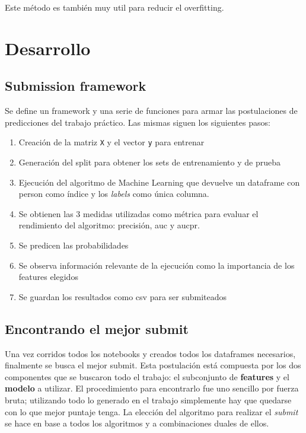 \documentclass[a4paper]{article}
\begin{document}
Este método es también muy util para reducir el overfitting.

\section{Desarrollo}

\subsection{Submission framework}

Se define un framework y una serie de funciones para armar las postulaciones de predicciones del trabajo práctico. Las mismas siguen los siguientes pasos:

\begin{enumerate}
	\item Creación de la matriz \texttt{X} y el vector \texttt{y} para entrenar
	\item Generación del split para obtener los sets de entrenamiento y de prueba
	\item Ejecución del algoritmo de Machine Learning que devuelve un dataframe con person como índice y los \textit{labels} como única columna.
	\item Se obtienen las 3 medidas utilizadas como métrica para evaluar el rendimiento del algoritmo: precisión, auc y aucpr.
	\item Se predicen las probabilidades 
	\item Se observa información relevante de la ejecución como la importancia de los features elegidos
	\item Se guardan los resultados como csv para ser submiteados
\end{enumerate}

\subsection{Encontrando el mejor submit}

Una vez corridos todos los notebooks y creados todos los dataframes necesarios, finalmente se busca el mejor submit. Esta postulación está compuesta por los dos componentes que se buscaron todo el trabajo: el subconjunto de \textbf{features} y el \textbf{modelo} a utilizar. El procedimiento para encontrarlo fue uno sencillo por fuerza bruta; utilizando todo lo generado en el trabajo simplemente hay que quedarse con lo que mejor puntaje tenga. La elección del algoritmo para realizar el \textit{submit} se hace en base a todos los algoritmos y a combinaciones duales de ellos.
\end{document}
